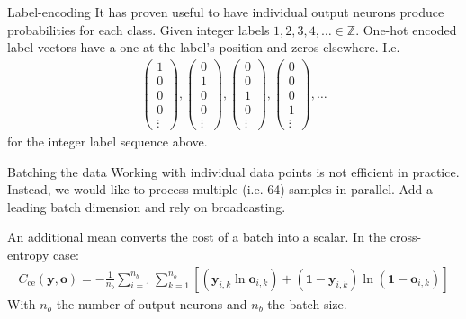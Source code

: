 \documentclass{beamer}
\begin{document}
    \begin{frame}{Label-encoding}
      It has proven useful to have individual output neurons produce probabilities for each class.
      Given integer labels $1,2,3,4, \dots \in \mathbb{Z}$. One-hot encoded label vectors have a one 
      at the label's position and zeros elsewhere. I.e.
      \begin{align}
        \begin{pmatrix}
          1 \\ 0 \\ 0 \\ 0 \\ \vdots
        \end{pmatrix},
        \begin{pmatrix}
          0 \\ 1 \\ 0 \\ 0 \\\vdots
        \end{pmatrix},
        \begin{pmatrix}
          0 \\ 0 \\ 1 \\ 0 \\\vdots
        \end{pmatrix},
        \begin{pmatrix}
          0 \\ 0 \\ 0 \\ 1 \\\vdots
        \end{pmatrix},
        \dots
      \end{align}
      for the integer label sequence above.
    \end{frame}


    \begin{frame}{Batching the data}
      Working with individual data points is not efficient in practice.
      Instead, we would like to process multiple (i.e. 64) samples in parallel. 
      Add a leading batch dimension and rely on broadcasting.

      An additional mean converts the cost of a batch into a scalar.
      In the cross-entropy case:
      \begin{align}
        C_{\text{ce}}(\mathbf{y},\mathbf{o})=-\frac{1}{n_b}\sum_{i=1}^{n_b}\sum_{k=1}^{n_o}[(\mathbf{y}_{i,k}\ln\mathbf{o}_{i,k})+(\mathbf{1}-\mathbf{y}_{i,k})\ln(\mathbf{1}-\mathbf{o}_{i,k})]
      \end{align}
      With $n_o$ the number of output neurons and $n_b$ the batch size.
    \end{frame}
\end{document}
